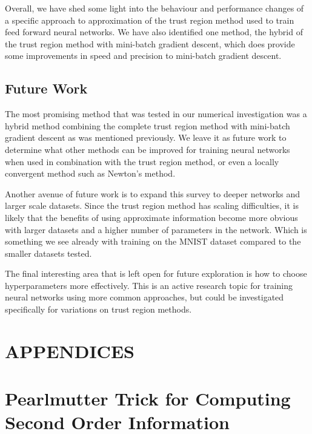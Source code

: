 \documentclass[letterpaper,12pt,titlepage,oneside,final]{book}
\begin{document}
	Overall, we have shed some light into the behaviour and performance changes of a specific approach to approximation of the trust region method used to train feed forward neural networks. We have also identified one method, the hybrid of the trust region method with mini-batch gradient descent, which does provide some improvements in speed and precision to mini-batch gradient descent.
	

	\section{Future Work}
	
	The most promising method that was tested in our numerical investigation was a hybrid method combining the complete trust region method with mini-batch gradient descent as was mentioned previously. We leave it as future work to determine what other methods can be improved for training neural networks when used in combination with the trust region method, or even a locally convergent method such as Newton's method.
	
	Another avenue of future work is to expand this survey to deeper networks and larger scale datasets. Since the trust region method has scaling difficulties, it is likely that the benefits of using approximate information become more obvious with larger datasets and a higher number of parameters in the network. Which is something we see already with training on the MNIST dataset compared to the smaller datasets tested.
	
	The final interesting area that is left open for future exploration is how to choose hyperparameters more effectively. This is an active research topic for training neural networks using more common approaches, but could be investigated specifically for variations on trust region methods. 
	
	\appendix
	
	\chapter*{APPENDICES}
	\chapter{Pearlmutter Trick for Computing Second Order Information}
	\label{appendix:pearlmutter}
	
\end{document}
